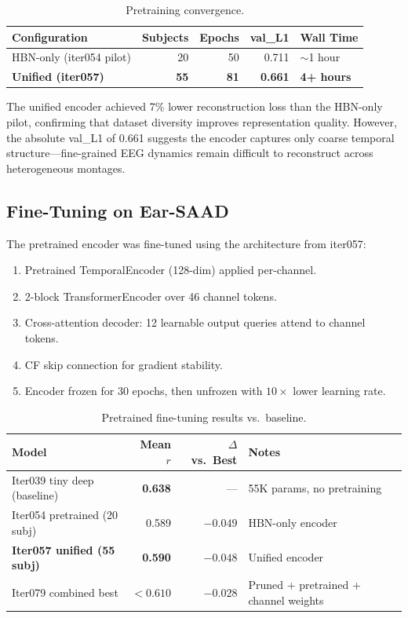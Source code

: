 \documentclass[11pt,a4paper]{article}
\begin{document}
\begin{table}[H]
\centering
\caption{Pretraining convergence.}
\begin{tabular}{lrrrl}
\toprule
Configuration & Subjects & Epochs & val\_L1 & Wall Time \\
\midrule
HBN-only (iter054 pilot) & 20 & 50 & 0.711 & $\sim$1 hour \\
\textbf{Unified (iter057)} & \textbf{55} & \textbf{81} & \textbf{0.661} & \textbf{4+ hours} \\
\bottomrule
\end{tabular}
\end{table}

The unified encoder achieved 7\% lower reconstruction loss than the
HBN-only pilot, confirming that dataset diversity improves representation
quality. However, the absolute val\_L1 of 0.661 suggests the encoder
captures only coarse temporal structure---fine-grained EEG dynamics remain
difficult to reconstruct across heterogeneous montages.

\subsection{Fine-Tuning on Ear-SAAD}

The pretrained encoder was fine-tuned using the architecture from iter057:

\begin{enumerate}
  \item Pretrained TemporalEncoder (128-dim) applied per-channel.
  \item 2-block TransformerEncoder over 46 channel tokens.
  \item Cross-attention decoder: 12 learnable output queries attend to
    channel tokens.
  \item CF skip connection for gradient stability.
  \item Encoder frozen for 30 epochs, then unfrozen with $10\times$ lower
    learning rate.
\end{enumerate}

\begin{table}[H]
\centering
\caption{Pretrained fine-tuning results vs.\ baseline.}
\begin{tabular}{lrrl}
\toprule
Model & Mean $r$ & $\Delta$ vs.\ Best & Notes \\
\midrule
Iter039 tiny deep (baseline) & \textbf{0.638} & --- & 55K params, no pretraining \\
Iter054 pretrained (20 subj) & 0.589 & \textcolor{bad}{$-0.049$} & HBN-only encoder \\
\textbf{Iter057 unified (55 subj)} & \textbf{0.590} & \textcolor{bad}{$-0.048$} & Unified encoder \\
Iter079 combined best & $<0.610$ & \textcolor{bad}{$-0.028$} & Pruned + pretrained + channel weights \\
\bottomrule
\end{tabular}
\end{table}
\end{document}

